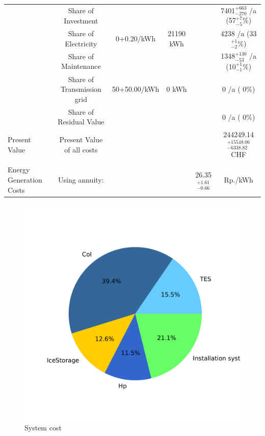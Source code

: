 \documentclass[english]{SPFShortReport}
\begin{document}
\begin{table}[!ht]
\begin{adjustbox}{max width =\textwidth}
\begin{tabular}{l | c c c c c }
 & Share of Investment & &&& 7401$^{\mathrm{+663}}_{\mathrm{-270}}$ /a (57$^{\mathrm{+ 7}}_{\mathrm{- 5}}$\%) \\
 & Share of Electricity & 0+0.20/kWh & 21190 kWh &  & 4238 /a (33$^{\mathrm{+ 1}}_{\mathrm{- 2}}$\%)\\
 & Share of Maintenance & &&& 1348$^{\mathrm{+130}}_{\mathrm{-53}}$ /a (10$^{\mathrm{+ 1}}_{\mathrm{- 1}}$\%)\\ 
 & Share of Transmission grid & 50+50.00/kWh & 0 kWh & &  0 /a ( 0\%)\\
 & Share of Residual Value &&& &  0 /a ( 0\%)\\
Present Value  & Present Value of all costs  & &&& 244249.14$^{\mathrm{+15548.06}}_{\mathrm{-6338.82}}$ CHF \\
\hline \\ 
 Energy Generation Costs & Using annuity: &&& 26.35$^{\mathrm{+1.61}}_{\mathrm{-0.66}}$ & Rp./kWh \\
\hline
\hline
\end{tabular}
\end{adjustbox}
\label{CostsTable}
\end{table}
\begin{figure}[!htbp]
\begin{center}
\includegraphics[width=1\textwidth]{costShare-System6_SolarIce_MFH30_flatPlate_HP20-CHE_tmy-Ac50-Vice20.pdf}
\caption{System cost}
\label{systemCost}
\end{center}
\end{figure}
\end{document}
